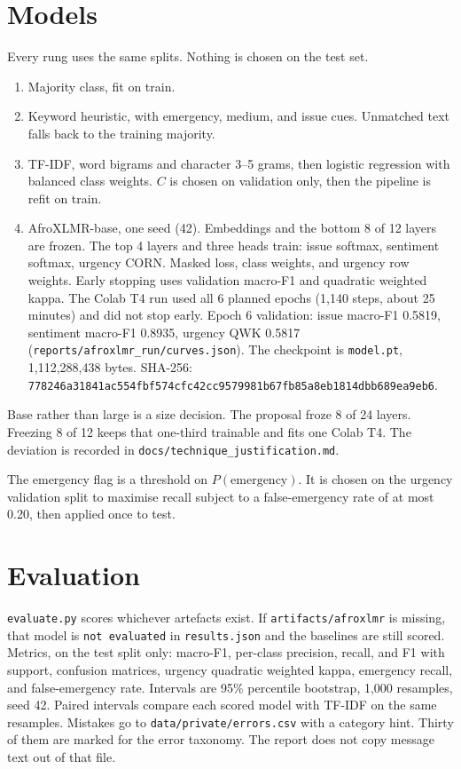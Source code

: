 \documentclass[11pt,a4paper]{article}
\begin{document}
\section{Models}

Every rung uses the same splits. Nothing is chosen on the test set.

\begin{enumerate}
  \item Majority class, fit on train.
  \item Keyword heuristic, with emergency, medium, and issue cues. Unmatched text falls back to the training majority.
  \item TF-IDF, word bigrams and character 3--5 grams, then logistic regression with balanced class weights. $C$ is chosen on validation only, then the pipeline is refit on train.
  \item AfroXLMR-base, one seed (42). Embeddings and the bottom 8 of 12 layers are frozen. The top 4 layers and three heads train: issue softmax, sentiment softmax, urgency CORN. Masked loss, class weights, and urgency row weights. Early stopping uses validation macro-F1 and quadratic weighted kappa. The Colab T4 run used all 6 planned epochs (1,140 steps, about 25 minutes) and did not stop early. Epoch 6 validation: issue macro-F1 0.5819, sentiment macro-F1 0.8935, urgency QWK 0.5817 (\texttt{reports/\allowbreak{}afroxlmr\_\allowbreak{}run/\allowbreak{}curves.json}). The checkpoint is \texttt{model.pt}, 1,112,288,438 bytes. SHA-256: \texttt{778246a3\allowbreak{}1841ac55\allowbreak{}4fbf574c\allowbreak{}fc42cc95\allowbreak{}79981b67\allowbreak{}fb85a8eb\allowbreak{}1814dbb6\allowbreak{}89ea9eb6}.
\end{enumerate}

Base rather than large is a size decision. The proposal froze 8 of 24 layers. Freezing 8 of 12 keeps that one-third trainable and fits one Colab T4. The deviation is recorded in \texttt{docs/\allowbreak{}technique\_\allowbreak{}justification.md}.

The emergency flag is a threshold on $P(\text{emergency})$. It is chosen on the urgency validation split to maximise recall subject to a false-emergency rate of at most 0.20, then applied once to test.

\section{Evaluation}

\texttt{evaluate.py} scores whichever artefacts exist. If \texttt{artifacts/\allowbreak{}afroxlmr} is missing, that model is \texttt{not evaluated} in \texttt{results.json} and the baselines are still scored. Metrics, on the test split only: macro-F1, per-class precision, recall, and F1 with support, confusion matrices, urgency quadratic weighted kappa, emergency recall, and false-emergency rate. Intervals are 95\% percentile bootstrap, 1,000 resamples, seed 42. Paired intervals compare each scored model with TF-IDF on the same resamples. Mistakes go to \texttt{data/\allowbreak{}private/\allowbreak{}errors.csv} with a category hint. Thirty of them are marked for the error taxonomy. The report does not copy message text out of that file.
\end{document}
